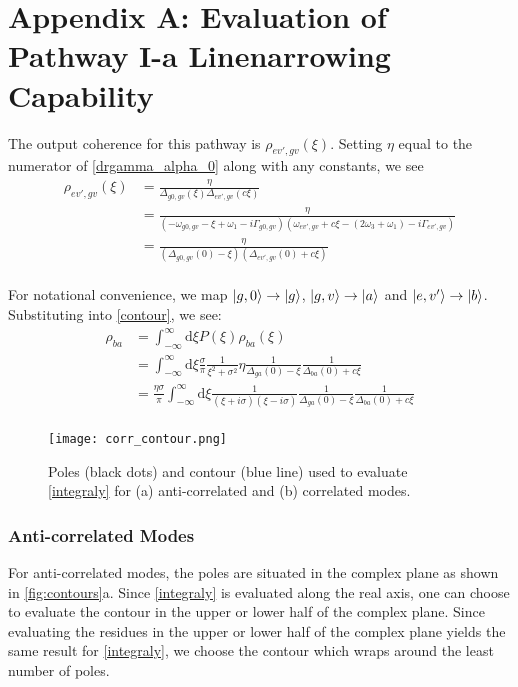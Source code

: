 \documentclass[aip, jcp, draft, onecolumn]{revtex4-2}
\begin{document}
\section{Appendix A: Evaluation of Pathway I-a Linenarrowing Capability}
\begin{widetext}
The output coherence  for this pathway is $\rho_{ev',gv}(\xi)$.
Setting $\eta$ equal to the numerator of \autoref{drgamma_alpha_0} along with any constants, we see
\begin{equation}\label{ev'gv}
	\begin{split}
		\rho_{ev',gv}(\xi) &= \frac{\eta}{\Delta_{g0,gv}(\xi) \Delta_{ev',gv}(c\xi)}\\
		&=  \frac{\eta}{(-\omega_{g0,gv} - \xi + \omega_1 - i\Gamma_{g0,gv})(\omega_{ev',gv} + c\xi - (2\omega_3 + \omega_1) - i\Gamma_{ev',gv})}\\ 
		&= \frac{\eta}{(\Delta_{g0,gv}(0) - \xi)(\Delta_{ev',gv}(0) + c\xi)}\\ 
	\end{split}
\end{equation}

For notational convenience, we map $\ket{g,0} \rightarrow \ket{g}$, $\ket{g,v} \rightarrow \ket{a}$ and $\ket{e,v'} \rightarrow \ket{b}$.
Substituting into \autoref{contour}, we see:
\begin{equation}\label{integraly}
	\begin{split}
		\rho_{ba} &= \int_{-\infty}^\infty \mathrm{d}\xi P(\xi) \rho_{ba}(\xi)\\
		&= \int_{-\infty}^\infty \mathrm{d}\xi \frac{\sigma}{\pi} \frac{1}{\xi^2 + \sigma^2} \eta \frac{1}{\Delta_{ga}(0) - \xi} \frac{1}{\Delta_{ba}(0) + c\xi}\\
		&= \frac{\eta \sigma}{\pi} \int_{-\infty}^\infty \mathrm{d}\xi\frac{1}{(\xi + i\sigma)(\xi - i\sigma)} \frac{1}{\Delta_{ga}(0) - \xi} \frac{1}{\Delta_{ba}(0) + c\xi}\\
	\end{split}
\end{equation}

\begin{figure}[!htbp]
	\centering
	\texttt{[image: corr\_contour.png]}
	\caption{Poles (black dots) and contour (blue line) used to evaluate \autoref{integraly} for (a) anti-correlated and (b) correlated modes.} 
	\label{fig:contours}
\end{figure}

\subsubsection{Anti-correlated Modes}
For anti-correlated modes, the poles are situated in the complex plane as shown in \autoref{fig:contours}a.
Since \autoref{integraly} is evaluated along the real axis, one can choose to evaluate the contour in the upper or lower half of the complex plane.
Since evaluating the residues in the upper or lower half of the complex plane yields the same result for \autoref{integraly}, we choose the contour which wraps around the least number of poles.


\end{widetext}
\end{document}

